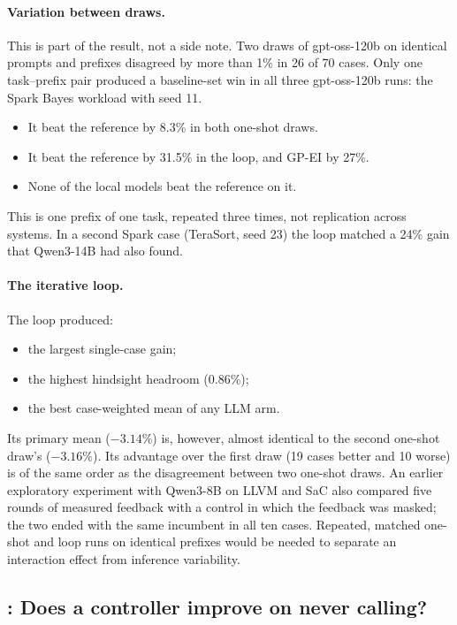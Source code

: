 \paragraph{Variation between draws.} This is part of the result, not a side note. Two draws of gpt-oss-120b on identical prompts and prefixes disagreed by more than 1\% in 26 of 70 cases. Only one task--prefix pair produced a baseline-set win in all three gpt-oss-120b runs: the Spark Bayes workload with seed 11.
\begin{itemize}
  \item It beat the reference by 8.3\% in both one-shot draws.
  \item It beat the reference by 31.5\% in the loop, and GP-EI by 27\%.
  \item None of the local models beat the reference on it.
\end{itemize}
This is one prefix of one task, repeated three times, not replication across systems. In a second Spark case (TeraSort, seed 23) the loop matched a 24\% gain that Qwen3-14B had also found.

\paragraph{The iterative loop.} The loop produced:
\begin{itemize}
  \item the largest single-case gain;
  \item the highest hindsight headroom (0.86\%);
  \item the best case-weighted mean of any LLM arm.
\end{itemize}
Its primary mean ($-3.14\%$) is, however, almost identical to the second one-shot draw's ($-3.16\%$). Its advantage over the first draw (19 cases better and 10 worse) is of the same order as the disagreement between two one-shot draws. An earlier exploratory experiment with Qwen3-8B on LLVM and SaC also compared five rounds of measured feedback with a control in which the feedback was masked; the two ended with the same incumbent in all ten cases. Repeated, matched one-shot and loop runs on identical prefixes would be needed to separate an interaction effect from inference variability.

\subsection{: Does a controller improve on never calling?}
\label{sec:rq4}

